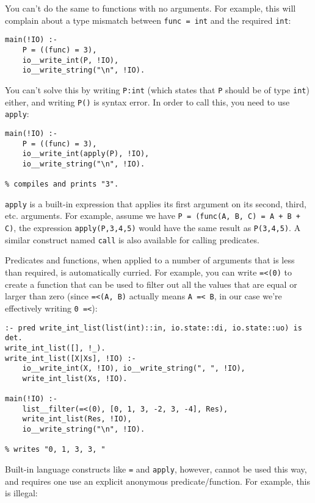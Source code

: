 You can't do the same to functions with no arguments. For example, this will complain about a type mismatch between \texttt{func = int} and the required \texttt{int}:

\begin{lstlisting}[language=Mercury]
main(!IO) :-
	P = ((func) = 3),
	io__write_int(P, !IO),
	io__write_string("\n", !IO).
\end{lstlisting}

You can't solve this by writing \texttt{P:int} (which states that \texttt{P} should be of type \texttt{int}) either, and writing \texttt{P()} is syntax error. In order to call this, you need to use \texttt{apply}:

\begin{lstlisting}[language=Mercury]
main(!IO) :-
	P = ((func) = 3),
	io__write_int(apply(P), !IO),
	io__write_string("\n", !IO).

% compiles and prints "3".
\end{lstlisting}

\texttt{apply} is a built-in expression that applies its first argument on its second, third, etc. arguments. For example, assume we have \texttt{P = (func(A, B, C) = A + B + C)}, the expression \texttt{apply(P,3,4,5)} would have the same result as \texttt{P(3,4,5)}. A similar construct named \texttt{call} is also available for calling predicates.

Predicates and functions, when applied to a number of arguments that is less than required, is automatically curried. For example, you can write \texttt{=<(0)} to create a function that can be used to filter out all the values that are equal or larger than zero (since \texttt{=<(A, B)} actually means \texttt{A =< B}, in our case we're effectively writing \texttt{0 =<}):

\begin{lstlisting}[language=Mercury]
:- pred write_int_list(list(int)::in, io.state::di, io.state::uo) is det.
write_int_list([], !_).
write_int_list([X|Xs], !IO) :-
	io__write_int(X, !IO), io__write_string(", ", !IO),
	write_int_list(Xs, !IO).

main(!IO) :-
	list__filter(=<(0), [0, 1, 3, -2, 3, -4], Res),
	write_int_list(Res, !IO),
	io__write_string("\n", !IO).

% writes "0, 1, 3, 3, "
\end{lstlisting}

Built-in language constructs like \texttt{=} and \texttt{apply}, however, cannot be used this way, and requires one use an explicit anonymous predicate/function. For example, this is illegal:

